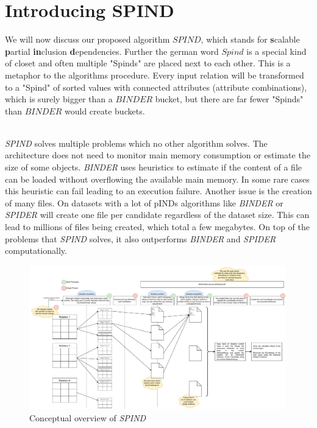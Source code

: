 \section{Introducing SPIND}

We will now discuss our proposed algorithm $SPIND$, which stands for \textbf{s}calable \textbf{p}artial \textbf{in}clusion \textbf{d}ependencies. Further the german word $Spind$ is a special kind of closet and often multiple "Spinds" are placed next to each other. This is a metaphor to the algorithms procedure. Every input relation will be transformed to a "Spind" of sorted values with connected attributes (attribute combinations), which is surely bigger than a $BINDER$ bucket, but there are far fewer "Spinds" than $BINDER$ would create buckets.

\noindent \\ \textit{SPIND} solves multiple problems which no other algorithm solves. The architecture does not need to monitor main memory consumption or estimate the size of some objects. \textit{BINDER} uses heuristics to estimate if the content of a file can be loaded without overflowing the available main memory. In some rare cases this heuristic can fail leading to an execution failure. Another issue is the creation of many files. On datasets with a lot of pINDs algorithms like \textit{BINDER} or \textit{SPIDER} will create one file per candidate regardless of the dataset size. This can lead to millions of files being created, which total a few megabytes. On top of the problems that \textit{SPIND} solves, it also outperforms \textit{BINDER} and \textit{SPIDER} computationally. 

\begin{figure}[h]
    \centering
    \includegraphics[width=0.99\textwidth]{files/SPIND.pdf}
    \caption{Conceptual overview of \textit{SPIND}}
    \label{fig:spind}
\end{figure}


